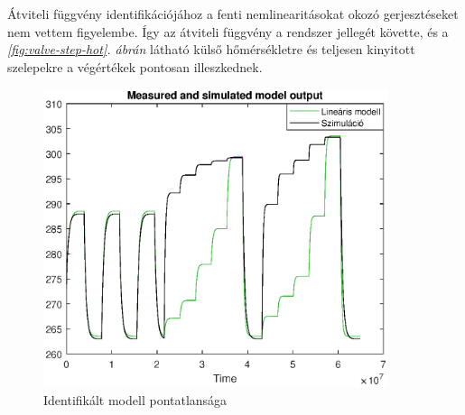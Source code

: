 Átviteli függvény identifikációjához a fenti nemlinearitásokat okozó gerjesztéseket nem vettem figyelembe. Így az átviteli függvény a rendszer jellegét követte, és a \textit{\ref{fig:valve-step-hot}. ábrán} látható külső hőmérsékletre és teljesen kinyitott szelepekre a végértékek pontosan illeszkednek.


\begin{figure}[H]
	\centering
	\includegraphics[trim=0 0 0 0, clip,width=0.9\textwidth]{figures/identModelOutputMatch}
	\caption{Identifikált modell pontatlansága}
	\label{fig:ident-model-mismatch}
\end{figure}

%
%
%
%


\pagebreak